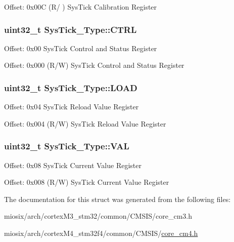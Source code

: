 Offset\-: 0x00\-C (R/ ) Sys\-Tick Calibration Register \hypertarget{struct_sys_tick___type_af2ad94ac83e5d40fc6e34884bc1bec5f}{
\subsubsection[{C\-T\-R\-L}]{ uint32\-\_\-t Sys\-Tick\-\_\-\-Type\-::\-C\-T\-R\-L}}\label{struct_sys_tick___type_af2ad94ac83e5d40fc6e34884bc1bec5f}
Offset\-: 0x00 Sys\-Tick Control and Status Register

Offset\-: 0x000 (R/\-W) Sys\-Tick Control and Status Register \hypertarget{struct_sys_tick___type_ae7bc9d3eac1147f3bba8d73a8395644f}{
\subsubsection[{L\-O\-A\-D}]{ uint32\-\_\-t Sys\-Tick\-\_\-\-Type\-::\-L\-O\-A\-D}}\label{struct_sys_tick___type_ae7bc9d3eac1147f3bba8d73a8395644f}
Offset\-: 0x04 Sys\-Tick Reload Value Register

Offset\-: 0x004 (R/\-W) Sys\-Tick Reload Value Register \hypertarget{struct_sys_tick___type_a0997ff20f11817f8246e8f0edac6f4e4}{
\subsubsection[{V\-A\-L}]{ uint32\-\_\-t Sys\-Tick\-\_\-\-Type\-::\-V\-A\-L}}\label{struct_sys_tick___type_a0997ff20f11817f8246e8f0edac6f4e4}
Offset\-: 0x08 Sys\-Tick Current Value Register

Offset\-: 0x008 (R/\-W) Sys\-Tick Current Value Register 

The documentation for this struct was generated from the following files\-:\begin{DoxyCompactItemize}
\item 
miosix/arch/cortex\-M3\-\_\-stm32/common/\-C\-M\-S\-I\-S/core\-\_\-cm3.\-h\item 
miosix/arch/cortex\-M4\-\_\-stm32f4/common/\-C\-M\-S\-I\-S/\hyperlink{core__cm4_8h}{core\-\_\-cm4.\-h}\end{DoxyCompactItemize}
